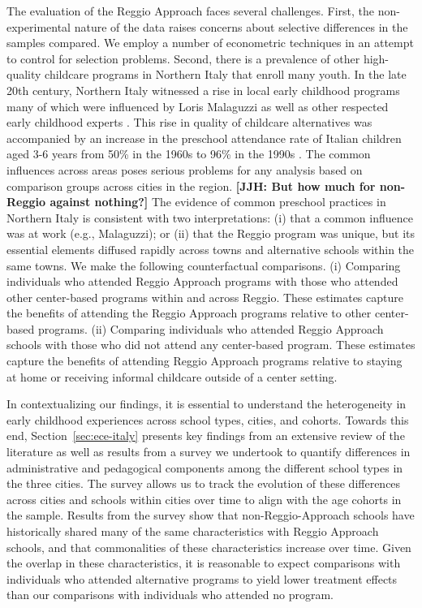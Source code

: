 The evaluation of the Reggio Approach faces several challenges. First, the non-experimental nature of the data raises concerns about selective differences in the samples compared. We employ a number of econometric techniques in an attempt to control for selection problems. Second, there is a prevalence of other high-quality childcare programs in Northern Italy that enroll many youth. In the late 20th century, Northern Italy witnessed a rise in local early childhood programs many of which were influenced by Loris Malaguzzi as well as other respected early childhood experts \citep{OECD_2001_Italy-Country-Note}. This rise in quality of childcare alternatives was accompanied by an increase in the preschool attendance rate of Italian children aged 3-6 years from 50\% in the 1960s to 96\% in the 1990s \citep{Hohnerlein_2015_Development-and-Diffusion}. The common influences across areas poses serious problems for any analysis based on comparison groups across cities in the region. \textbf{[JJH: But how much for non-Reggio against nothing?]} The evidence of common preschool practices in Northern Italy is consistent with two interpretations: (i) that a common influence was at work (e.g., Malaguzzi); or (ii) that the Reggio program was unique, but its essential elements diffused rapidly across towns and alternative schools within the same towns. We make the following counterfactual comparisons. (i) Comparing individuals who attended Reggio Approach programs with those who attended other center-based programs within and across Reggio. These estimates capture the benefits of attending the Reggio Approach programs relative to other center-based programs. (ii) Comparing individuals who attended Reggio Approach schools with those who did not attend any center-based program. These estimates capture the benefits of attending Reggio Approach programs relative to staying at home or receiving informal childcare outside of a center setting.

In contextualizing our findings, it is essential to understand the heterogeneity in early childhood experiences across school types, cities, and cohorts. Towards this end, Section~\ref{sec:ece-italy} presents key findings from an extensive review of the literature as well as results from a survey we undertook to quantify differences in administrative and pedagogical components among the different school types in the three cities. The survey allows us to track the evolution of these differences across cities and schools within cities over time to align with the age cohorts in the sample. Results from the survey show that non-Reggio-Approach schools have historically shared many of the same characteristics with Reggio Approach schools, and that commonalities of these characteristics increase over time. Given the overlap in these characteristics, it is reasonable to expect comparisons with individuals who attended alternative programs to yield lower treatment effects than our comparisons with individuals who attended no program.

